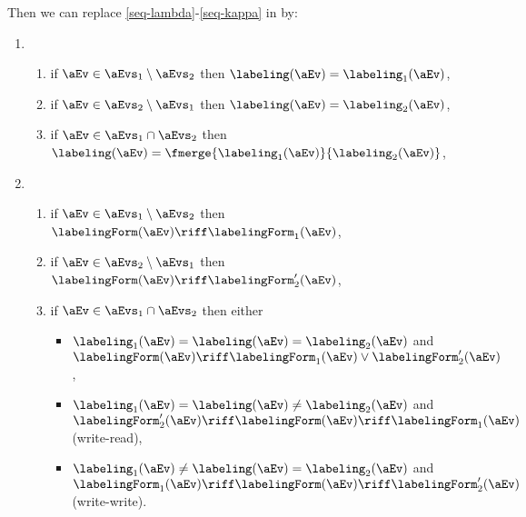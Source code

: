 Then we can replace \ref{seq-lambda}-\ref{seq-kappa} in  by:
\begin{enumerate}[topsep=0pt,label=(\textsc{s}\arabic*),ref=\textsc{s}\arabic*]
\item[] \setcounter{enumi}{\value{lambda}} 
  \begin{enumerate}[leftmargin=0pt]
  \item \label{seq-lambda-merge1x}
    if $\aEv\in\aEvs_1\setminus\aEvs_2$ then $\labeling(\aEv)=\labeling_1(\aEv)$,
  \item \label{seq-lambda-merge2x}
    if $\aEv\in\aEvs_2\setminus\aEvs_1$ then $\labeling(\aEv)=\labeling_2(\aEv)$,
  \item \label{seq-lambda-merge12x}
    if $\aEv\in\aEvs_1\cap\aEvs_2$ then $\labeling(\aEv)= \fmerge{\labeling_1(\aEv)}{\labeling_2(\aEv)}$,
  \end{enumerate}
\item[] \setcounter{enumi}{\value{kappa}} 
  \begin{enumerate}[leftmargin=0pt]
  \item \label{seq-kappa-merge1x}
    if $\aEv\in\aEvs_1\setminus\aEvs_2$ then $\labelingForm(\aEv) \riff \labelingForm_1(\aEv)$,
  \item \label{seq-kappa-merge2x}
    if $\aEv\in\aEvs_2\setminus\aEvs_1$ then $\labelingForm(\aEv) \riff \labelingForm'_2(\aEv)$,
  \item \label{seq-kappa-merge12x}
    if $\aEv\in\aEvs_1\cap\aEvs_2$ then either
    \begin{itemize}
    \item $\labeling_1(\aEv)=\labeling(\aEv)=\labeling_2(\aEv)$ and
      $\labelingForm(\aEv) \riff \labelingForm_1(\aEv)\lor\labelingForm'_2(\aEv)$, 
    \item $\labeling_1(\aEv)=\labeling(\aEv)\neq\labeling_2(\aEv)$ and
      $\labelingForm_2'(\aEv) \riff \labelingForm(\aEv) \riff \labelingForm_1(\aEv)$ 
      (write-read),
    \item $\labeling_1(\aEv)\neq\labeling(\aEv)=\labeling_2(\aEv)$ and
      $\labelingForm_1(\aEv) \riff \labelingForm(\aEv) \riff \labelingForm_2'(\aEv)$ 
      (write-write).
    \end{itemize}
  \end{enumerate}
\end{enumerate}

